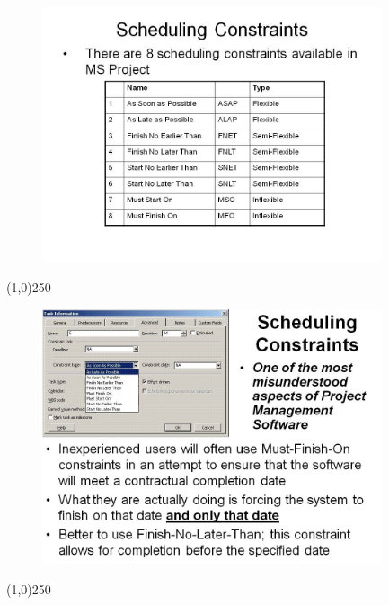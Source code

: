 \begin{frame}
\begin{figure}
	\centering
		\includegraphics[width = 10.0cm]{oldnotes/Slide182.jpg}
\end{figure}
\end{frame}
\begin{center}\line(1,0){250}\end{center}




\begin{frame}
\begin{figure}
	\centering
		\includegraphics[width = 10.0cm]{oldnotes/Slide183.jpg}
\end{figure}
\end{frame}
\begin{center}\line(1,0){250}\end{center}




